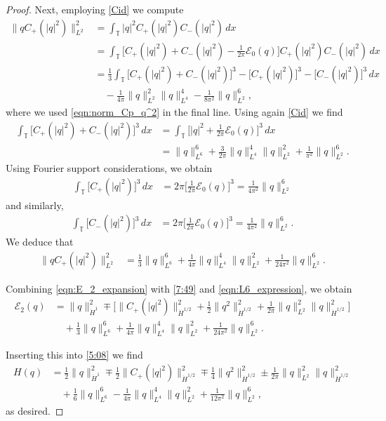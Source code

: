 \documentclass[10pt,a4paper]{amsart}
\newcommand{\T}{\mathbb{T}}
\begin{document}
\begin{proof}
Next, employing \eqref{Cid} we compute
\begin{align*}
\|q C_+(|q|^2)\|^2_{L^2}
&=\int_\T |q|^2 C_+(|q|^2)C_-(|q|^2)\,dx\\
&=\int_\T  \bigl[C_+(|q|^2)+C_-(|q|^2) -\tfrac1{2\pi} \mathcal{E}_0(q)\bigr]C_+(|q|^2)C_-(|q|^2)\,dx\\
&=\tfrac{1}{3}\int_\T\bigl[C_+(|q|^2)+C_-(|q|^2)\bigr]^3-\bigl[ C_+(|q|^2)\bigr]^3-\bigl[C_-(|q|^2)\bigr]^3\,dx\\
&\quad-\tfrac1{4\pi}\|q\|_{L^2}^2\|q\|_{L^4}^4-\tfrac1{8\pi^2}\|q\|_{L^2}^6,
\end{align*}
where we used \eqref{eqn:norm_Cp_q^2} in the final line.  Using again \eqref{Cid} we find
\begin{align*}
\int_\T\bigl[C_+(|q|^2)+C_-(|q|^2)\bigr]^3\,dx
&=\int_\T\bigl[|q|^2+\tfrac1{2\pi}\mathcal{E}_0(q)\bigr]^3\,dx\\
&=\|q\|_{L^6}^6+\tfrac3{2\pi}\|q\|_{L^4}^4\|q\|_{L^2}^2+\tfrac{1}{\pi^2}\|q\|_{L^2}^6.
\end{align*}
Using Fourier support considerations, we obtain
\begin{align*}
\int_\T\bigl[ C_+(|q|^2)\bigr]^3\,dx&=2\pi\bigl[\tfrac{1}{2\pi}\mathcal{E}_0(q)\bigr]^3=\tfrac{1}{4\pi^2} \|q\|_{L^2}^6
\end{align*}
and similarly,
\begin{align*}
\int_\T\bigl[ C_-(|q|^2)\bigr]^3\,dx&=2\pi\bigl[\tfrac{1}{2\pi}\mathcal{E}_0(q)\bigr]^3=\tfrac{1}{4\pi^2} \|q\|_{L^2}^6.
\end{align*}
We deduce that
\begin{align}
\|q C_+(|q|^2)\|^2_{L^2}
&=\tfrac{1}{3}\|q\|_{L^6}^6+\tfrac1{4\pi}\|q\|_{L^4}^4\|q\|_{L^2}^2+\tfrac{1}{24\pi^2}\|q\|_{L^2}^6.\label{eqn:L6_expression}
\end{align}

Combining \eqref{eqn:E_2_expansion} with \eqref{7:49} and \eqref{eqn:L6_expression}, we obtain 
\begin{align}
\mathcal{E}_2(q)&=\|q\|_{\dot{H}^{1}}^2\mp\bigl[\| C_+(|q|^2)\|_{\dot{H}^{1/2}}^2+\tfrac12\|q^2\|_{\dot{H}^{1/2}}^2+\tfrac1{2\pi}\|q\|_{L^2}^2\|q\|_{\dot{H}^{1/2}}^2\bigr]\nonumber\\
&\quad+\tfrac{1}{3}\|q\|_{L^6}^6+\tfrac1{4\pi}\|q\|_{L^4}^4\|q\|_{L^2}^2+\tfrac{1}{24\pi^2}\|q\|_{L^2}^6.\label{eqn:E2}
\end{align}

Inserting this into \eqref{5:08} we find
\begin{align*}
H(q)&= \tfrac12\|q\|_{\dot{H}^{1}}^2\mp\tfrac12\| C_+(|q|^2)\|_{\dot{H}^{1/2}}^2\mp\tfrac14\|q^2\|_{\dot{H}^{1/2}}^2\pm \tfrac1{2\pi}\|q\|_{L^2}^2\|q\|_{\dot{H}^{1/2}}^2\\
&\quad+\tfrac{1}{6}\|q\|_{L^6}^6-\tfrac1{4\pi}\|q\|_{L^4}^4\|q\|_{L^2}^2+\tfrac{1}{12\pi^2}\|q\|_{L^2}^6,
\end{align*}
as desired.
\end{proof}
\end{document}
